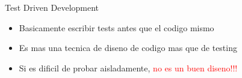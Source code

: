 
\begin{frame}{Test Driven Development} 
    \begin{itemize}
        \item Basicamente escribir tests antes que el codigo mismo
    \end{itemize}

    \begin{itemize}
        \item Es mas una tecnica de diseno de codigo mas que de testing
        \item Si es dificil de probar aisladamente, \textcolor{red}{no es un buen diseno!!!}
    \end{itemize}
\end{frame}





